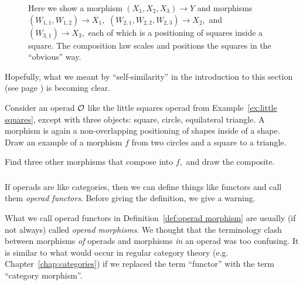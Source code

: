 \documentclass[../main/CT4S-EN-RU]{subfiles}
\begin{document}
\begin{exampleENG}
\begin{figure}[H]
\begin{center}
\end{center}
\caption{Here we show a morphism $(X_1,X_2,X_3)\to Y$ and morphisms $(W_{1,1},W_{1,2})\to X_1,$ $(W_{2,1},W_{2,2},W_{2,3})\to X_2,$ and $(W_{3,1})\to X_3,$ each of which is a positioning of squares inside a square. The composition law scales and positions the squares in the “obvious” way.}
\label{fig:composition law for squares}
\end{figure}

Hopefully, what we meant by “self-similarity” in the introduction to this section (see page \pageref{sec:operad}) is becoming clear.
\end{exampleENG}

\begin{exampleRUS}\label{ex:little squares}
\end{exampleRUS}

\begin{exerciseENG}\label{exc:little shapes}
Consider an operad $\mathcal{O}$ like the little squares operad from Example~\ref{ex:little squares}, except with three objects: square, circle, equilateral triangle. A morphism is again a non-overlapping positioning of shapes inside of a shape. 
\sexc Draw an example of a morphism $f$ from two circles and a square to a triangle.
\item Find three other morphisms that compose into $f,$ and draw the composite.
\endsexc
\end{exerciseENG}

\begin{exerciseRUS}\label{exc:little shapes}
\end{exerciseRUS}


\subsubsection{}

\begin{blockENG}
If operads are like categories, then we can define things like functors and call them {\em operad functors}. Before giving the definition, we give a warning.
\end{blockENG}

\begin{blockRUS}
\end{blockRUS}

\begin{warningENG}
What we call operad functors in Definition~\ref{def:operad morphism} are usually (if not always) called {\em operad morphisms}. We thought that the terminology clash between morphisms {\em of} operads and morphisms {\em in} an operad was too confusing. It is similar to what would occur in regular category theory (e.g. Chapter~\ref{chap:categories}) if we replaced the term “functor” with the term “category morphism”. 
\end{warningENG}
\end{document}
